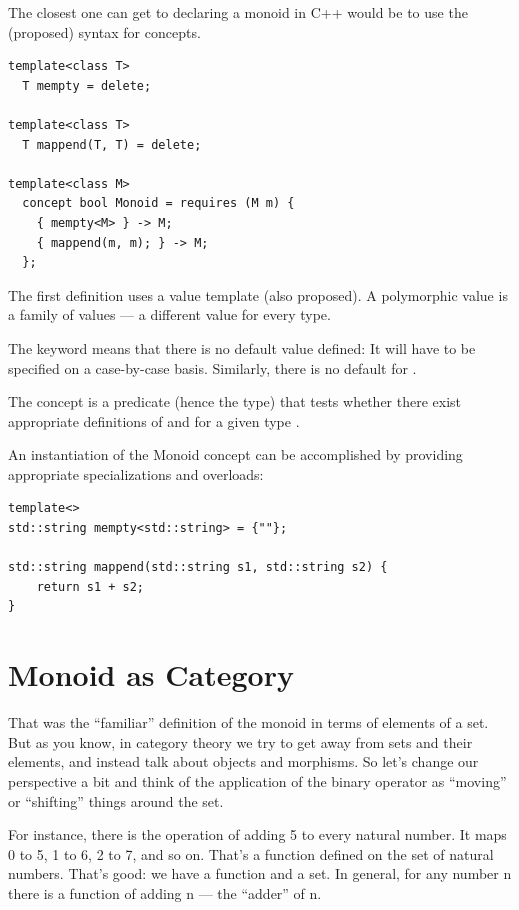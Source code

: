The closest one can get to declaring a monoid in C++ would be to use the
(proposed) syntax for concepts.

\begin{verbatim}
template<class T>
  T mempty = delete;
  
template<class T>
  T mappend(T, T) = delete;
  
template<class M> 
  concept bool Monoid = requires (M m) { 
    { mempty<M> } -> M; 
    { mappend(m, m); } -> M;
  };
\end{verbatim}
The first definition uses a value template (also proposed). A
polymorphic value is a family of values --- a different value for every
type.

The keyword  means that there is no default value
defined: It will have to be specified on a case-by-case basis.
Similarly, there is no default for .

The concept  is a predicate (hence the 
type) that tests whether there exist appropriate definitions of
 and  for a given type .

An instantiation of the Monoid concept can be accomplished by providing
appropriate specializations and overloads:

\begin{verbatim}
template<>
std::string mempty<std::string> = {""};

std::string mappend(std::string s1, std::string s2) { 
    return s1 + s2;
}
\end{verbatim}

\section{Monoid as Category}\label{monoid-as-category}

That was the ``familiar'' definition of the monoid in terms of elements
of a set. But as you know, in category theory we try to get away from
sets and their elements, and instead talk about objects and morphisms.
So let's change our perspective a bit and think of the application of
the binary operator as ``moving'' or ``shifting'' things around the set.

For instance, there is the operation of adding 5 to every natural
number. It maps 0 to 5, 1 to 6, 2 to 7, and so on. That's a function
defined on the set of natural numbers. That's good: we have a function
and a set. In general, for any number n there is a function of adding n
--- the ``adder'' of n.

